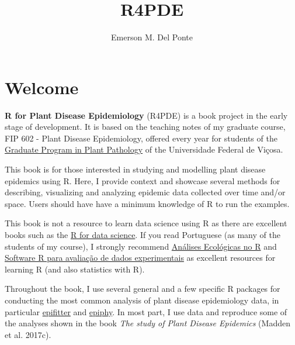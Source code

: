 \documentclass[
  letterpaper,
  DIV=11,
  numbers=noendperiod]{scrreprt}
\title{R4PDE}
\author{Emerson M. Del Ponte}
\date{}
\renewcommand*\contentsname{Table of contents}
\newcommand\contentsname{Table of contents}
\begin{document}
\maketitle
\ifdefined\Shaded\renewenvironment{Shaded}{\begin{tcolorbox}[breakable, interior hidden, frame hidden, borderline west={3pt}{0pt}{shadecolor}, enhanced, sharp corners, boxrule=0pt]}{\end{tcolorbox}}\fi

\renewcommand*\contentsname{Table of contents}
{
\hypersetup{linkcolor=}
\setcounter{tocdepth}{2}
\tableofcontents
}

\hypertarget{welcome}{%
\chapter*{Welcome}\label{welcome}}

\textbf{R for Plant Disease Epidemiology} (R4PDE) is a book project in
the early stage of development. It is based on the teaching notes of my
graduate course, FIP 602 - Plant Disease Epidemiology, offered every
year for students of the \href{http://www.dfp.ufv.br/grad/}{Graduate
Program in Plant Pathology} of the Universidade Federal de Viçosa.

This book is for those interested in studying and modelling plant
disease epidemics using R. Here, I provide context and showcase several
methods for describing, visualizing and analyzing epidemic data
collected over time and/or space. Users should have have a minimum
knowledge of R to run the examples.

This book is not a resource to learn data science using R as there are
excellent books such as the \href{https://r4ds.had.co.nz/}{R for data
science}. If you read Portuguese (as many of the students of my course),
I strongly recommend
\href{https://analises-ecologicas.netlify.app/}{Análises Ecológicas no
R} and \href{https://tiagoolivoto.github.io/e-bookr/index.html}{Software
R para avaliação de dados experimentais} as excellent resources for
learning R (and also statistics with R).

Throughout the book, I use several general and a few specific R packages
for conducting the most common analysis of plant disease epidemiology
data, in particular
\href{https://alvesks.github.io/epifitter/}{epifitter} and
\href{https://chgigot.github.io/epiphy/}{epiphy}. In most part, I use
data and reproduce some of the analyses shown in the book \emph{The
study of Plant Disease Epidemics} (Madden et al. 2017c).
\end{document}
